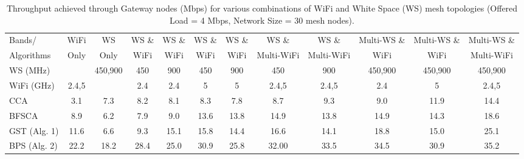    \begin{table}[t] 
   \centering %
   \begin{tabular}{|l|c|c|c|c|c|c|c|c|c|c|c|} %
   \hline %
   Bands/     & WiFi    & WS      & WS \& & WS \& &  WS \& & WS \& & WS \&      &  WS \&      & Multi-WS \& & Multi-WS \& & Multi-WS \& \\%
   Algorithms & Only    & Only    & WiFi  & WiFi  &  WiFi  & WiFi  & Multi-WiFi &  Multi-WiFi & WiFi        & WiFi        & Multi-WiFi  \\
	   \hline %
	   WS (MHz)   &							    & 450,900 & 450 &  900  &  450   & 900		 & 450    & 900      & 450,900     & 450,900     & 450,900     \\
		   \hline
		   WiFi (GHz) & 2.4,5 &								  & 2.4 &  2.4  &  5   & 5		 & 2.4,5& 2.4,5	 & 2.4		   & 5         & 2.4,5     \\ %
		   \hline
		   \hline %
		   CCA~\cite{draves2004routing}			    & 3.1   &  7.3  & 8.2    &8.1    &8.3		 &7.8     &   8.7    &   9.3&     9.0             &         11.9     &   14.4          \\
			   \hline %
			   BFSCA~\cite{ramachandran2006interference}  & 8.9   &  6.2  & 7.9    & 9.0   & 13.6 	 & 13.8   &  14.9    &   13.8&      14.9           &      14.3       &       18.6      \\ 
			   \hline %
			   GST (Alg. 1)								& 11.6  &   6.6 & 9.3    &   15.1&   15.8	 &  14.4  &   16.6   &    14.1  &   18.8            &  15.0           &    25.1         \\
				   \hline %
				   BPS (Alg. 2)								& 22.2  & 18.2  &  28.4  & 25.0  & 30.9 	 & 25.8   &   32.00  &  33.5       &     34.5            &      30.9       &       35.2      \\ 
				   \hline %
				   \end{tabular} 
				   \label{tab:2channelcombination} 
				   \caption{Throughput achieved through Gateway nodes (Mbps) for various combinations of WiFi and White Space (WS) mesh topologies (Offered Load = 4 Mbps, Network Size = 30 mesh nodes).} %
				   \vspace{-0.1in}
				   \end{table} 

